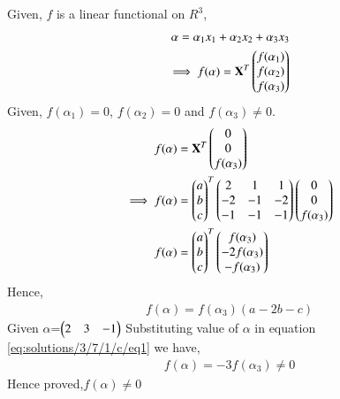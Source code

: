 Given, $f$ is a linear functional on $R^3$,
\begin{align}
\mathbf{\alpha} = \alpha_1 x_1 + \alpha_2 x_2 + \alpha_3 x_3\\
\implies f(\alpha) = \mathbf{X}^T \begin{pmatrix}f(\alpha_1)\\f(\alpha_2)\\f(\alpha_3)\end{pmatrix}
\end{align}
Given, $f(\alpha_1)=0$, $f(\alpha_2)=0$ and $f(\alpha_3)\neq 0$.
\begin{align}
 f(\alpha) &= \mathbf{X}^T \begin{pmatrix}0\\0\\f(\alpha_3)\end{pmatrix}\\
\implies f(\alpha) &= \begin{pmatrix}a\\b\\c\end{pmatrix}^T\begin{pmatrix}2 &1&1\\-2&-1&-2 \\-1&-1&-1\end{pmatrix}\begin{pmatrix}0\\0\\f(\alpha_3)\end{pmatrix}\\
f(\alpha)&=\begin{pmatrix}a\\b\\c\end{pmatrix}^T\begin{pmatrix}f(\alpha_3)\\-2f(\alpha_3)\\-f(\alpha_3)\end{pmatrix}
\end{align}
Hence,
\begin{align}\label{eq:solutions/3/7/1/c/eq1}
f(\alpha)=f(\alpha_3)(a-2b-c)
\end{align}
Given 
$\alpha$=$\begin{pmatrix}2&3&-1\end{pmatrix}$
Substituting value of $\alpha$ in equation \eqref{eq:solutions/3/7/1/c/eq1} we have,
\begin{align}
f(\alpha)=-3f(\alpha_3)\neq 0
\end{align}
Hence proved,$f(\alpha)\neq 0$

   
   

